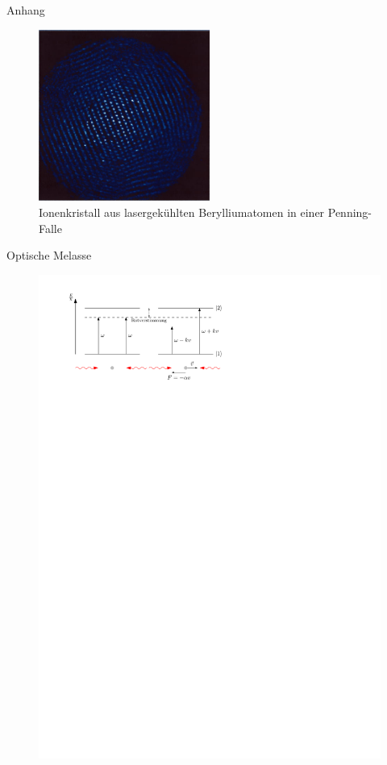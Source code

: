 \documentclass[12pt,xcolor=dvipsnames]{beamer}
\begin{document}
\begin{frame}{Anhang}
	\begin{figure}
		\includegraphics[width=0.5\textwidth]{./figures/ionenkristall.png}
		\caption{Ionenkristall aus lasergekühlten Berylliumatomen in einer Penning-Falle \cite{wpw}}
	\end{figure}
\end{frame}

\begin{frame}{Optische Melasse}
\begin{figure}[h]
	\centering
	\includegraphics[width=\textwidth]{./figures/melasse.pdf}
\end{figure}
\end{frame}
\end{document}
